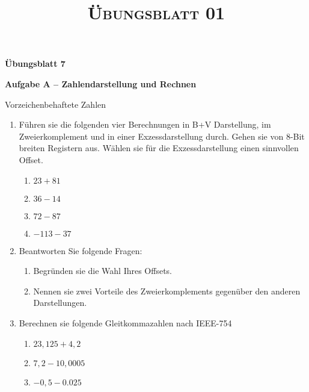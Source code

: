 \documentclass[paper=a4,fontsize=11pt]{scrartcl}%
\title{	
\normalfont \normalsize 
\textsc{Übungsblatt 01}
}
\numberwithin{equation}{section}
\begin{document}
\vspace*{-1cm}
\begin{center}
\Large{\textbf{Übungsblatt 7}}
\end{center}

\begin{center}\Large{\textbf{Aufgabe A -- Zahlendarstellung und Rechnen}}\end{center}
Vorzeichenbehaftete Zahlen
\begin{enumerate}
	\item Führen sie die folgenden vier Berechnungen in B+V Darstellung, im Zweierkomplement und in einer Exzessdarstellung durch. Gehen sie von 8-Bit breiten Registern aus. Wählen sie für die Exzessdarstellung einen sinnvollen Offset.
	\begin{enumerate}
		\item $23 + 81$
		\item $36 - 14$
		\item $72 - 87$
		\item $-113 - 37$
	\end{enumerate}
	\item Beantworten Sie folgende Fragen:
	\begin{enumerate}
		\item Begründen sie die Wahl Ihres Offsets.
		\item Nennen sie zwei Vorteile des Zweierkomplements gegenüber den anderen Darstellungen.
	\end{enumerate}
	\item Berechnen sie folgende Gleitkommazahlen nach IEEE-754
	\begin{enumerate}
		\item $23,125 + 4,2$
		\item $7,2 - 10,0005$
		\item $-0,5 - 0.025$ 
	\end{enumerate}
\end{enumerate}
\end{document}
